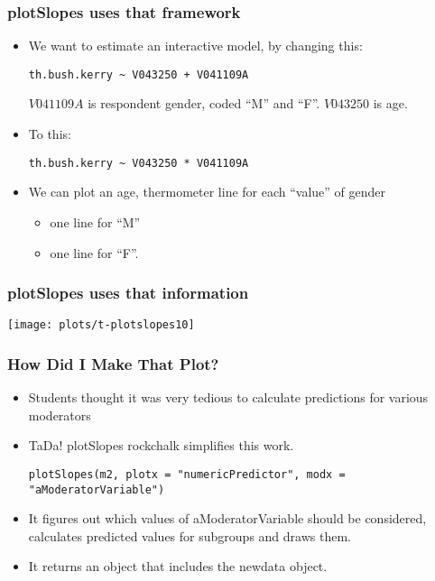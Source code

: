 \documentclass[10pt,english]{beamer}
\begin{document}
\begin{frame}
\frametitle{plotSlopes uses that framework}
\begin{itemize}
\item We want to estimate an interactive model, by changing this:


\textrm{}
\begin{lstlisting}
th.bush.kerry ~ V043250 + V041109A
\end{lstlisting}


$V041109A$ is respondent gender, coded ``M'' and ``F''. $V043250$
is age.

\item To this:


\textrm{}
\begin{lstlisting}
th.bush.kerry ~ V043250 * V041109A
\end{lstlisting}

\item We can plot an age, thermometer line for each ``value'' of gender

\begin{itemize}
\item one line for ``M''
\item one line for ``F''. 
\end{itemize}
\end{itemize}
\end{frame}

\begin{frame}
\frametitle{plotSlopes uses that information}


\texttt{[image: plots/t-plotslopes10]}

\end{frame}

\begin{frame}
\frametitle{How Did I Make That Plot?}
\begin{itemize}
\item Students thought it was very tedious to calculate predictions for
various moderators
\item TaDa! plotSlopes rockchalk simplifies this work.


\begin{lstlisting}
plotSlopes(m2, plotx = "numericPredictor", modx = "aModeratorVariable")
\end{lstlisting}

\item It figures out which values of aModeratorVariable should be considered,
calculates predicted values for subgroups and draws them.
\item It returns an object that includes the newdata object.
\end{itemize}


\end{frame}
\end{document}
